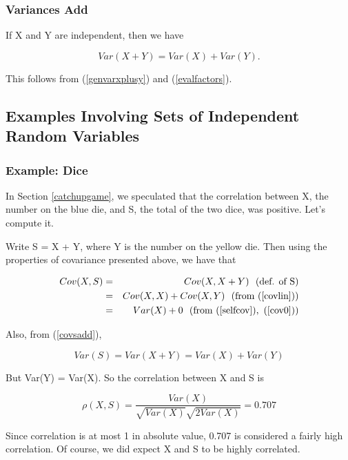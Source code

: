 \subsubsection{Variances Add}

If X and Y are independent, then we have

\begin{equation}
\label{covsadd}
Var(X+Y) = Var(X) + Var(Y).
\end{equation}

This follows from (\ref{genvarxplusy}) and (\ref{evalfactors}). 

\subsection{Examples Involving Sets of Independent Random Variables}

\subsubsection{Example:  Dice}
\label{diceex}

In Section \ref{catchupgame}, we speculated that the correlation between
X, the number on the blue die, and S, the total of the two dice, was
positive.  Let's compute it.

Write S = X + Y, where Y is the number on the yellow die.  Then
using the properties of covariance presented above, we have that 

\begin{eqnarray}
Cov(X,S) &=& Cov(X,X+Y) ~~ (\textrm{def. of S}) \\ 
&=& Cov(X,X) + Cov(X,Y) ~~ (\textrm{from } (\ref{covlin})) \\
&=& Var(X) + 0 ~~ (\textrm{from } (\ref{selfcov}),~ (\ref{cov0}))
\end{eqnarray}

Also, from (\ref{covsadd}),

\begin{equation}
Var(S) =  Var(X+Y) = Var(X) + Var(Y)
\end{equation}

But Var(Y) = Var(X).  So the correlation between X and S is

\begin{equation}
\rho(X,S) = \frac{Var(X)}
{\sqrt{Var(X)} \sqrt{2Var(X)}} = 0.707
\end{equation}

Since correlation is at most 1 in absolute value, 0.707 is considered a
fairly high correlation.  Of course, we did expect X and S to be highly
correlated.


